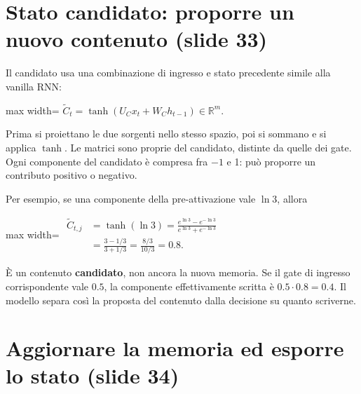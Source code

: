 \documentclass[11pt,a4paper,oneside,openany]{book}
\begin{document}
\section{Stato candidato: proporre un nuovo contenuto (slide 33)}\label{f03-r741}

Il candidato usa una combinazione di ingresso e stato precedente simile alla vanilla RNN:

\begin{center}
\begin{adjustbox}{max width=\linewidth}
$\displaystyle \boxed{\widetilde C_t=\tanh(U_Cx_t+W_Ch_{t-1})\in\mathbb R^m.}$
\end{adjustbox}
\end{center}

Prima si proiettano le due sorgenti nello stesso spazio, poi si sommano e si applica \(\tanh\). Le matrici sono proprie del candidato, distinte da quelle dei gate. Ogni componente del candidato è compresa fra \(-1\) e 1: può proporre un contributo positivo o negativo.

Per esempio, se una componente della pre-attivazione vale \(\ln3\), allora

\begin{center}
\begin{adjustbox}{max width=\linewidth}
$\displaystyle 
\begin{aligned}
\widetilde C_{t,j}
&=\tanh(\ln3)
=\frac{e^{\ln3}-e^{-\ln3}}{e^{\ln3}+e^{-\ln3}}\\
&=\frac{3-1/3}{3+1/3}=\frac{8/3}{10/3}=0.8.
\end{aligned}
$
\end{adjustbox}
\end{center}

È un contenuto \textbf{candidato}, non ancora la nuova memoria. Se il gate di ingresso corrispondente vale \(0.5\), la componente effettivamente scritta è \(0.5\cdot0.8=0.4\). Il modello separa così la proposta del contenuto dalla decisione su quanto scriverne.

\section{Aggiornare la memoria ed esporre lo stato (slide 34)}\label{f03-r762}
\end{document}
